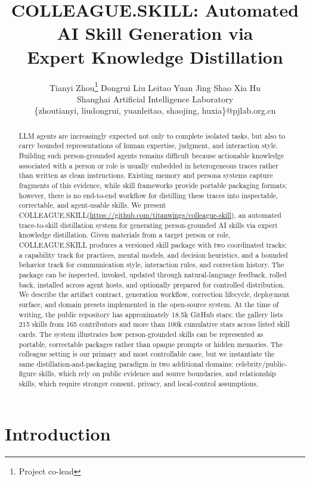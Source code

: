 \documentclass{article}
\title{\textsc{COLLEAGUE.SKILL}: Automated AI Skill Generation via\\ Expert Knowledge Distillation}
\author{%
  Tianyi Zhou\thanks{Project co-lead}\quad
  Dongrui Liu\footnotemark[1]\quad
  Leitao Yuan\quad
  Jing Shao\quad
  Xia Hu\\[0.4em]
  Shanghai Artificial Intelligence Laboratory\\[0.4em]
  \{zhoutianyi, liudongrui, yuanleitao, shaojing, huxia\}@pjlab.org.cn
}
\newcommand{\system}{\textsc{COLLEAGUE.SKILL}\xspace}
\begin{document}
\maketitle

\begin{abstract}
LLM agents are increasingly expected not only to complete isolated tasks, but also to carry bounded representations of human expertise, judgment, and interaction style. Building such person-grounded agents remains difficult because actionable knowledge associated with a person or role is usually embedded in heterogeneous traces rather than written as clean instructions. Existing memory and persona systems capture fragments of this evidence, while skill frameworks provide portable packaging formats; however, there is no end-to-end workflow for distilling these traces into inspectable, correctable, and agent-usable skills. We present \system (\url{https://github.com/titanwings/colleague-skill}), an automated trace-to-skill distillation system for generating person-grounded AI skills via expert knowledge distillation. Given materials from a target person or role, \system produces a versioned skill package with two coordinated tracks: a capability track for practices, mental models, and decision heuristics, and a bounded behavior track for communication style, interaction rules, and correction history. The package can be inspected, invoked, updated through natural-language feedback, rolled back, installed across agent hosts, and optionally prepared for controlled distribution. We describe the artifact contract, generation workflow, correction lifecycle, deployment surface, and domain presets implemented in the open-source system. At the time of writing, the public repository has approximately 18.5k GitHub stars; the gallery lists 215 skills from 165 contributors and more than 100k cumulative stars across listed skill cards. The system illustrates how person-grounded skills can be represented as portable, correctable packages rather than opaque prompts or hidden memories. The colleague setting is our primary and most controllable case, but we instantiate the same distillation-and-packaging paradigm in two additional domains: celebrity/public-figure skills, which rely on public evidence and source boundaries, and relationship skills, which require stronger consent, privacy, and local-control assumptions.
\end{abstract}

\section{Introduction}
\end{document}
